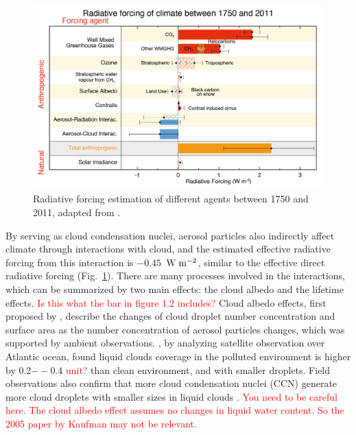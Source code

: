 \documentclass[edeposit,fullpage]{uiucthesis2009}
\makeatletter
\DeclareRobustCommand*\unit[1]
 {\ensuremath{%
   {\thinmuskip3mu\relax
    \def\mu{\text{\textmu}}\def~{\,}%
    \ifx\f@series\testbx\mathbf{#1}\else\mathrm{#1}\fi}}}
\makeatother
\begin{document}
\begin{figure}
	\centering
	\includegraphics[scale=0.80]{chap1_figs/thesis_chap1_fig1.jpeg}
	\caption{Radiative forcing estimation of different agents between 1750 and 2011, adapted from \cite{IPCC_CHAPTER8}.}
	\label{fig:chap1-aerosol-climate}
\end{figure}

By serving as cloud condensation nuclei, aerosol particles also
indirectly affect climate through interactions with cloud, and the
estimated effective radiative forcing from this interaction is
$-0.45$~\unit{W\;m^{-2}}, similar to the effective direct radiative
forcing (Fig.~\ref{fig:chap1-aerosol-climate}). There are many
processes involved in the interactions, which can be summarized by two
main effects: the cloud albedo and the lifetime
effects. \textcolor{red}{Is this what the bar in figure 1.2 includes?}
Cloud albedo effects, first proposed by \citet{twomey1977influence},
describe the changes of cloud droplet number concentration and surface
area as the number concentration of aerosol particles changes, which
was supported by ambient observations. \citet{kaufman2005effect}, by
analyzing satellite observation over Atlantic ocean, found liquid
clouds coverage in the polluted environment is higher by 0.2$--$0.4
\textcolor{red}{unit?}  than clean environment, and with smaller
droplets. Field observations also confirm that more cloud condensation
nuclei (CCN) generate more cloud droplets with smaller sizes in liquid
clouds
\citep{jia2019distinct,kleinman2012aerosol}. \textcolor{red}{You need
  to be careful here. The cloud albedo effect assumes no changes in
  liquid water content. So the 2005 paper by Kaufman may not be
  relevant.}
\end{document}
